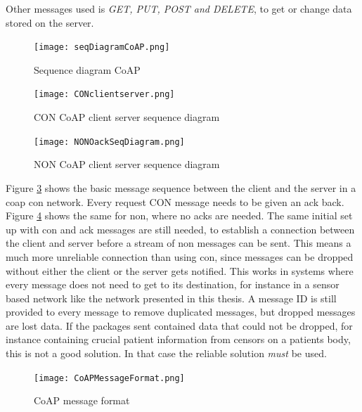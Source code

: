 Other messages used is \textit{GET, PUT, POST and DELETE}, to get or change data stored on the server. 
      

\begin{figure}[ht]
    \centering
    \texttt{[image: seqDiagramCoAP.png]}    
    \caption{Sequence diagram CoAP}
    \label{fig:seqDiagramCoAP}
\end{figure}

\begin{figure}[ht]
    \centering
    \texttt{[image: CONclientserver.png]}    
    \caption{CON CoAP client server sequence diagram}
    \label{fig:CONclientserver}
\end{figure}


\begin{figure}[ht]
    \centering
    \texttt{[image: NONOackSeqDiagram.png]}    
    \caption{NON CoAP client server sequence diagram}
    \label{fig:NONOackSeqDiagram}
\end{figure}

Figure \ref{fig:NONOackSeqDiagram} shows the basic message sequence between the client and the server in a \gls{coap} \gls{con} network. Every request CON message needs to be given an ack back. Figure \ref{fig:CoAPMessageFormat} shows the same for \gls{non}, where no \glspl{ack} are needed. The same initial set up with con and ack messages are still needed, to establish a connection between the client and server before a stream of \gls{non} messages can be sent. This means a much more unreliable connection than using \gls{con}, since messages can be dropped without either the client or the server gets notified. This works in systems where every message does not need to get to its destination, for instance in a sensor based network like the network presented in this thesis. A message ID is still provided to every message to remove duplicated messages, but dropped messages are lost data. If the packages sent contained data that could not be dropped, for instance containing crucial patient information from censors on a patients body, this is not a good solution. In that case the reliable solution \textit{must} be used. 


\begin{figure}[ht]
    \centering
    \texttt{[image: CoAPMessageFormat.png]}    
    \caption{CoAP message format}
    \label{fig:CoAPMessageFormat}
\end{figure}



